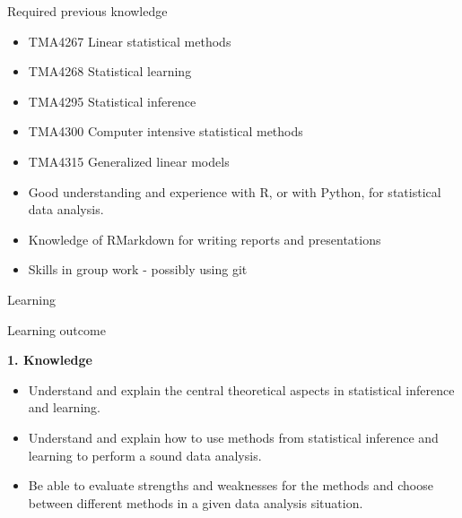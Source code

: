 \documentclass[
  ignorenonframetext,
]{beamer}
\providecommand{\tightlist}{%
  \setlength{\itemsep}{0pt}\setlength{\parskip}{0pt}}
\begin{document}
\begin{frame}

\begin{block}{Required previous knowledge}

\begin{itemize}
\tightlist
\item
  TMA4267 Linear statistical methods
\item
  TMA4268 Statistical learning
\item
  TMA4295 Statistical inference
\item
  TMA4300 Computer intensive statistical methods
\item
  TMA4315 Generalized linear models
\item
  Good understanding and experience with R, or with Python, for
  statistical data analysis.
\item
  Knowledge of RMarkdown for writing reports and presentations
\item
  Skills in group work - possibly using git
\end{itemize}

\end{block}

\end{frame}

\begin{frame}{Learning}
\protect\hypertarget{learning}{}

\begin{block}{Learning outcome}

\textbf{1. Knowledge}

\begin{itemize}
\tightlist
\item
  Understand and explain the central theoretical aspects in statistical
  inference and learning.
\item
  Understand and explain how to use methods from statistical inference
  and learning to perform a sound data analysis.
\item
  Be able to evaluate strengths and weaknesses for the methods and
  choose between different methods in a given data analysis situation.
\end{itemize}

\end{block}

\end{frame}
\end{document}
